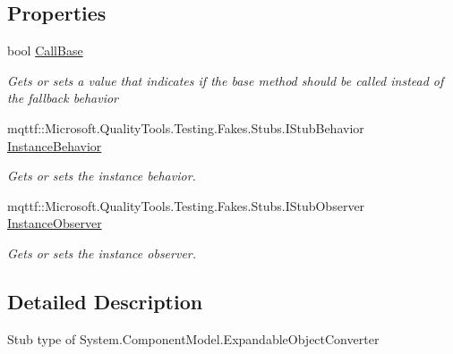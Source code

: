 \subsection*{Properties}
\begin{DoxyCompactItemize}
\item 
bool \hyperlink{class_system_1_1_component_model_1_1_fakes_1_1_stub_expandable_object_converter_a5c801c545b07ca87c10062b7e0b38117}{Call\-Base}
\begin{DoxyCompactList}\small\item\em Gets or sets a value that indicates if the base method should be called instead of the fallback behavior\end{DoxyCompactList}\item 
mqttf\-::\-Microsoft.\-Quality\-Tools.\-Testing.\-Fakes.\-Stubs.\-I\-Stub\-Behavior \hyperlink{class_system_1_1_component_model_1_1_fakes_1_1_stub_expandable_object_converter_a4247adb531d9dbabcfaf73d9886ea781}{Instance\-Behavior}
\begin{DoxyCompactList}\small\item\em Gets or sets the instance behavior.\end{DoxyCompactList}\item 
mqttf\-::\-Microsoft.\-Quality\-Tools.\-Testing.\-Fakes.\-Stubs.\-I\-Stub\-Observer \hyperlink{class_system_1_1_component_model_1_1_fakes_1_1_stub_expandable_object_converter_ab70e777907e30cf18d5dd6fe451444e8}{Instance\-Observer}
\begin{DoxyCompactList}\small\item\em Gets or sets the instance observer.\end{DoxyCompactList}\end{DoxyCompactItemize}


\subsection{Detailed Description}
Stub type of System.\-Component\-Model.\-Expandable\-Object\-Converter



